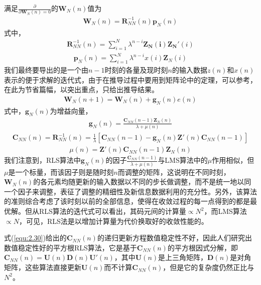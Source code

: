 满足$\frac{\partial}{\partial\mathbf{W}_N(n)=0}$的$\mathbf{W}_N(n)$值为
\begin{eqnarray}
    \mathbf{W}_N(n)=\mathbf{R}^{-1}_{NN}(n)\mathbf{p}_N(n)
    \label{equ:2.25}
\end{eqnarray}
式中，
  \begin{eqnarray}
      \mathbf{R}^{-1}_{NN}(n)=\sum_{i=1}^N\lambda^{n-i}\mathbf{Z_N(i)}{\mathbf{Z_N}}'(i)  
    \label{equ:2.26}
\end{eqnarray}
\begin{eqnarray}
    \mathbf{p}_N(n)=\sum_{i=1}^N\lambda^{n-i}x(i)\mathbf{Z}_N(i)
    \label{equ:2.27}
\end{eqnarray}
我们最终要导出的是一个由$n-1$时刻的各量及现时刻$n$的输入数据$z(n)$和$x(n)$表示的便于求解的迭代式，由于在推导过程中要用到矩阵论中的定理，可以参考，在此为节省篇幅，以突出重点，只给出推导结果。
\begin{eqnarray}
    \mathbf{W}_N(n+1)=\mathbf{W}_N(n)+\mathbf{g}_N(n)e(n)
    \label{equ:2.28}
\end{eqnarray}
式中，$\mathbf{g}_N(n)$为增益向量，
\begin{eqnarray}
    \mathbf{g}_N(n)=\frac{\mathbf{C}_{NN}(n-1)\mathbf{Z}_N(n)}{\lambda+\mu(n)}
    \label{equ:2.29}
\end{eqnarray}
\begin{eqnarray}
    \mathbf{C}_{NN}(n)=\mathbf{R}^{-1}_{NN}(n)=\frac{1}{\lambda}[\mathbf{C}_{NN}(n-1)-\mathbf{g}_N(n){\mathbf{Z}}'(n)\mathbf{C}_{NN}(n-1)]
    \label{equ:2.30}
\end{eqnarray}
\begin{eqnarray}
    \mu(n)={\mathbf{Z}}'(n)\mathbf{C}_{NN}(n-1)\mathbf{Z}_N(n)
    \label{equ:2.31}
\end{eqnarray}
我们注意到，RLS算法中$\mathbf{g}_N(n)$的因子$\frac{\mathbf{C}_{NN}(n-1)}{\lambda+\mu(n)}$与LMS算法中的$\mu$作用相似，但$\mu$是一个标量，而该因子则是随时刻$n$而调整的矩阵，这说明在不同时刻，$\mathbf{W}_N(n)$的各元素均随更新的输入数据以不同的步长做调整，而不是统一地以同一个因子来调整，表征了调整的精细性及新信息数据利用的充分性。另外，该算法的准则综合考虑了该时刻以前的全部信息，使得在收敛过程的每一点得到的都是最优解。但从RLS算法的迭代式可以看出，其码元间的计算量$\propto
N^2$，而LMS算法$\propto
N$，可见，RLS法是以增加计算量为代价换取好的收敛性能的。

式(\ref{equ:2.30})给出的$\mathbf{C}_{NN}(n)$的递归更新方程数值稳定性不好，因此人们研究出数值稳定性好的平方根RLS算法，它是基于$\mathbf{C}_{NN}(n)$的平方根因式分解，即$\mathbf{C}_{NN}(n)=\mathbf{U}(n)\mathbf{D}(n){\mathbf{U}}'(n)$，其中$\mathbf{U}(n)$是上三角矩阵，$\mathbf{D}(n)$是对角矩阵，这些算法直接更新$\mathbf{U}(n)$而不计算$\mathbf{C}_{NN}(n)$，但是它的复杂度仍然正比与$N^2$。

